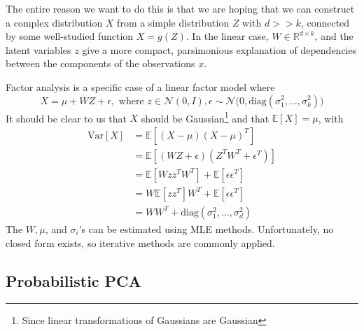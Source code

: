   The entire reason we want to do this is that we are hoping that we can construct a complex distribution $X$ from a simple distribution $Z$ with $d >> k$, connected by some well-studied function $X = g(Z)$. In the linear case, $W \in \mathbb{R}^{d \times k}$, and the latent variables $z$ give a more compact, parsimonious  explanation of dependencies between the components of the observations $x$. 

  \begin{definition} 
    Factor analysis is a specific case of a linear factor model where 
    \begin{equation}
      X = \mu + WZ + \epsilon, \text{ where } z \in \mathcal{N}(0, I), \epsilon \sim \mathcal{N} \big(0, \mathrm{diag}(\sigma_1^2, \ldots, \sigma_k^2) \big)
    \end{equation}
    It should be clear to us that $X$ should be Gaussian\footnote{Since linear transformations of Gaussians are Gaussian} and that $\mathbb{E}[X] = \mu$, with 
    \begin{align} 
        \mathrm{Var}[X] & = \mathbb{E}[ (X - \mu)(X - \mu)^T ] \\
                        & = \mathbb{E}[ (W Z + \epsilon) (Z^T W^T + \epsilon^T)] \\
                        & = \mathbb{E}[W z z^T W^T] + \mathbb{E}[ \epsilon \epsilon^T] \\
                        & = W \mathbb{E}[ z z^T] W^T + \mathbb{E}[ \epsilon \epsilon^T] \\
                        & = W W^T + \mathrm{diag}(\sigma_1^2, \ldots, \sigma_d^2) 
    \end{align} 
    The $W, \mu$, and $\sigma_i$'s can be estimated using MLE methods. Unfortunately, no closed form  exists, so iterative methods are commonly applied. 
  \end{definition} 

\subsection{Probabilistic PCA}

